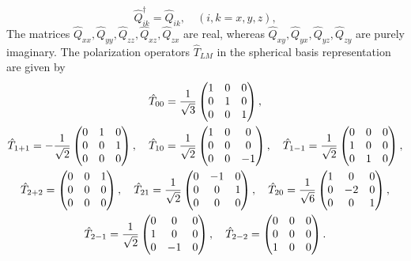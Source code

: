 \begin{equation}
\widehat{Q}_{i k}^{\dagger}=\widehat{Q}_{i k}, \quad(i, k=x, y, z), \label{eq:2:6:16}
\end{equation}
The matrices $\hat{Q}_{x x}, \hat{Q}_{y y}, \hat{Q}_{z z}, \hat{Q}_{x z}, \hat{Q}_{z x}$ are real, whereas $\hat{Q}_{x y}, \hat{Q}_{y x}, \hat{Q}_{y z}, \hat{Q}_{z y}$ are purely imaginary. The polarization operators $\widehat{T}_{L M}$ in the spherical basis representation are given by
\begin{gather}
\hat{T}_{00}=\frac{1}{\sqrt{3}}\begin{pmatrix}
1 & 0 & 0 \\
0 & 1 & 0 \\
0 & 0 & 1
\end{pmatrix},  \label{eq:2:6:17}\\
\hat{T}_{1+1}=-\frac{1}{\sqrt{2}}\begin{pmatrix}
0 & 1 & 0 \\
0 & 0 & 1 \\
0 & 0 & 0
\end{pmatrix}, \quad \hat{T}_{10}=\frac{1}{\sqrt{2}}\begin{pmatrix}
1 & 0 & 0 \\
0 & 0 & 0 \\
0 & 0 & -1
\end{pmatrix}, \quad \hat{T}_{1-1}=\frac{1}{\sqrt{2}}\begin{pmatrix}
0 & 0 & 0 \\
1 & 0 & 0 \\
0 & 1 & 0
\end{pmatrix},  \label{eq:2:6:18}\\
\hat{T}_{2+2}=\begin{pmatrix}
0 & 0 & 1 \\
0 & 0 & 0 \\
0 & 0 & 0
\end{pmatrix}, \quad \hat{T}_{21}=\frac{1}{\sqrt{2}}\begin{pmatrix}
0 & -1 & 0 \\
0 & 0 & 1 \\
0 & 0 & 0
\end{pmatrix}, \quad \hat{T}_{20}=\frac{1}{\sqrt{6}}\begin{pmatrix}
1 & 0 & 0 \\
0 & -2 & 0 \\
0 & 0 & 1
\end{pmatrix},  \notag\\
\hat{T}_{2-1}=\frac{1}{\sqrt{2}}\begin{pmatrix}
0 & 0 & 0 \\
1 & 0 & 0 \\
0 & -1 & 0
\end{pmatrix}, \quad \hat{T}_{2-2}=\begin{pmatrix}
0 & 0 & 0 \\
0 & 0 & 0 \\
1 & 0 & 0
\end{pmatrix} . \label{eq:2:6:19}
\end{gather}
